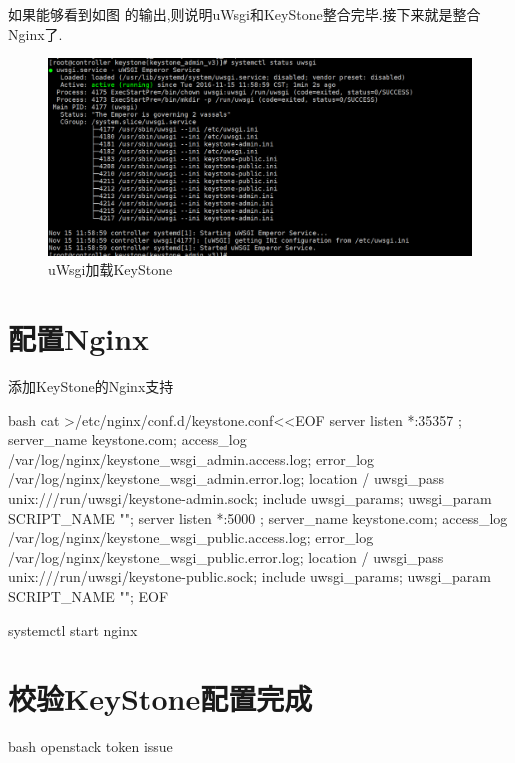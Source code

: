 如果能够看到如图 的输出,则说明uWsgi和KeyStone整合完毕.接下来就是整合Nginx了.
\begin{figure}[H]
  \centering
  \includegraphics[scale=0.38]{uwsgi.png}
  \caption{uWsgi加载KeyStone}
  \label{fig:uwsgi}
\end{figure}

\section{配置Nginx}
添加KeyStone的Nginx支持
\begin{code-block}{bash}
cat >/etc/nginx/conf.d/keystone.conf<<EOF
server {
  listen                *:35357 ;
  server_name           keystone.com;
  access_log            /var/log/nginx/keystone_wsgi_admin.access.log;
  error_log             /var/log/nginx/keystone_wsgi_admin.error.log;
  location / {
    uwsgi_pass       unix:///run/uwsgi/keystone-admin.sock;
    include          uwsgi_params;
    uwsgi_param      SCRIPT_NAME   "";
  }
}
server {
  listen                *:5000 ;
  server_name           keystone.com;
  access_log            /var/log/nginx/keystone_wsgi_public.access.log;
  error_log             /var/log/nginx/keystone_wsgi_public.error.log;
  location / {
    uwsgi_pass       unix:///run/uwsgi/keystone-public.sock;
    include          uwsgi_params;
    uwsgi_param      SCRIPT_NAME   "";
  }
}
EOF

systemctl start nginx
\end{code-block}

\section{校验KeyStone配置完成}
\begin{code-block}{bash}
openstack token issue
\end{code-block}
